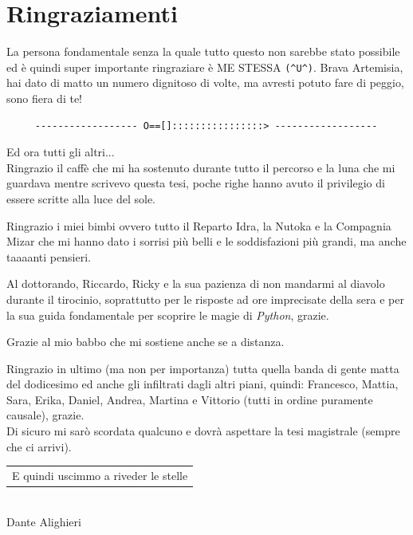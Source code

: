 \documentclass[11pt,oneside]{book}
\begin{document}
\chapter*{Ringraziamenti}
La persona fondamentale senza la quale tutto questo non sarebbe stato possibile ed è quindi super importante ringraziare è ME STESSA \verb{(^U^){. Brava Artemisia, hai dato di matto un numero dignitoso di volte, ma avresti potuto fare di peggio, sono fiera di te!
\begin{center}
\begin{verbatim}
     ------------------ O==[]::::::::::::::::> ------------------
\end{verbatim}
\end{center}
\noindent Ed ora tutti gli altri... \\
Ringrazio il caffè che mi ha sostenuto durante tutto il percorso e la luna che mi guardava mentre scrivevo questa tesi, poche righe hanno avuto il privilegio di essere scritte alla luce del sole.

\noindent Ringrazio i miei bimbi ovvero tutto il Reparto Idra, la Nutoka e la Compagnia Mizar che mi hanno dato i sorrisi più belli e le soddisfazioni più grandi, ma anche taaaanti pensieri. 

\noindent Al dottorando, Riccardo, Ricky e la sua pazienza di non mandarmi al diavolo durante il tirocinio, soprattutto per le risposte ad ore imprecisate della sera e per la sua guida fondamentale per scoprire le magie di \textit{Python}, grazie.

\noindent Grazie al mio babbo che mi sostiene anche se a distanza. 


\noindent Ringrazio in ultimo (ma non per importanza) tutta quella banda di gente matta del dodicesimo ed anche gli infiltrati dagli altri piani, quindi: Francesco, Mattia, Sara, Erika, Daniel, Andrea, Martina e Vittorio (tutti in ordine puramente causale), grazie. \\


\noindent Di sicuro mi sarò scordata qualcuno e dovrà aspettare la tesi magistrale (sempre che ci arrivi).




\cleardoublepage
\thispagestyle{empty}
\begin{flushright}
\itshape
\begin{tabular}{@{}l@{}}
E quindi uscimmo a riveder le stelle \\
\end{tabular}\\[3pt]
Dante Alighieri

\end{flushright}
\cleardoublepage
\end{document}
